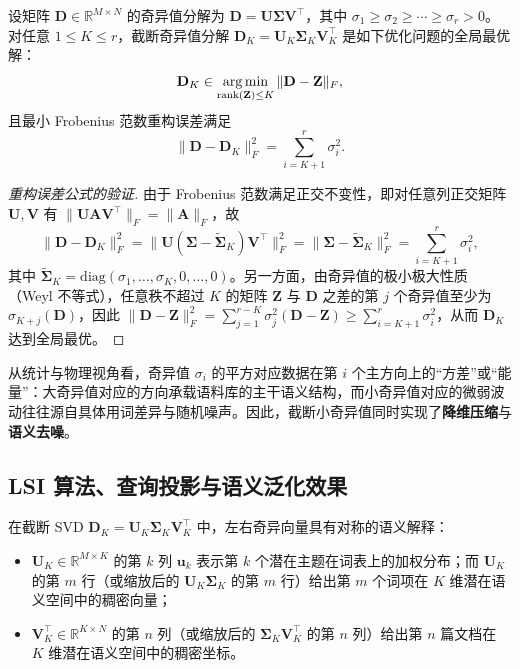 \begin{theorem}\label{thm:eym}
设矩阵 $\mathbf{D}\in\mathbb{R}^{M\times N}$ 的奇异值分解为 $\mathbf{D}=\mathbf{U}\boldsymbol{\Sigma}\mathbf{V}^\top$，其中 $\sigma_1\ge\sigma_2\ge\cdots\ge\sigma_r>0$。对任意 $1\le K\le r$，截断奇异值分解 $\mathbf{D}_K = \mathbf{U}_K\boldsymbol{\Sigma}_K\mathbf{V}_K^\top$ 是如下优化问题的全局最优解：
\[
\mathbf{D}_K \in \operatorname*{arg\,min}_{\mathrm{rank}(\mathbf{Z})\le K} \|\mathbf{D} - \mathbf{Z}\|_F,
\]
且最小 Frobenius 范数重构误差满足
\[
\|\mathbf{D} - \mathbf{D}_K\|_F^2 = \sum_{i=K+1}^{r} \sigma_i^2.
\]
\end{theorem}
\begin{proof}[重构误差公式的验证]
由于 Frobenius 范数满足正交不变性，即对任意列正交矩阵 $\mathbf{U}, \mathbf{V}$ 有 $\|\mathbf{U}\mathbf{A}\mathbf{V}^\top\|_F = \|\mathbf{A}\|_F$，故
\[
\|\mathbf{D} - \mathbf{D}_K\|_F^2
= \|\mathbf{U}(\boldsymbol{\Sigma} - \tilde{\boldsymbol{\Sigma}}_K)\mathbf{V}^\top\|_F^2
= \|\boldsymbol{\Sigma} - \tilde{\boldsymbol{\Sigma}}_K\|_F^2
= \sum_{i=K+1}^{r} \sigma_i^2,
\]
其中 $\tilde{\boldsymbol{\Sigma}}_K=\mathrm{diag}(\sigma_1,\dots,\sigma_K,0,\dots,0)$。另一方面，由奇异值的极小极大性质（Weyl 不等式），任意秩不超过 $K$ 的矩阵 $\mathbf{Z}$ 与 $\mathbf{D}$ 之差的第 $j$ 个奇异值至少为 $\sigma_{K+j}(\mathbf{D})$，因此 $\|\mathbf{D}-\mathbf{Z}\|_F^2 = \sum_{j=1}^{r-K}\sigma_j^2(\mathbf{D}-\mathbf{Z}) \ge \sum_{i=K+1}^r \sigma_i^2$，从而 $\mathbf{D}_K$ 达到全局最优。
\end{proof}

从统计与物理视角看，奇异值 $\sigma_i$ 的平方对应数据在第 $i$ 个主方向上的“方差”或“能量”：大奇异值对应的方向承载语料库的主干语义结构，而小奇异值对应的微弱波动往往源自具体用词差异与随机噪声。因此，截断小奇异值同时实现了\textbf{降维压缩}与\textbf{语义去噪}。

\subsection{LSI 算法、查询投影与语义泛化效果}

在截断 SVD $\mathbf{D}_K = \mathbf{U}_K \boldsymbol{\Sigma}_K \mathbf{V}_K^\top$ 中，左右奇异向量具有对称的语义解释：
\begin{itemize}
  \item $\mathbf{U}_K\in\mathbb{R}^{M\times K}$ 的第 $k$ 列 $\mathbf{u}_k$ 表示第 $k$ 个潜在主题在词表上的加权分布；而 $\mathbf{U}_K$ 的第 $m$ 行（或缩放后的 $\mathbf{U}_K\boldsymbol{\Sigma}_K$ 的第 $m$ 行）给出第 $m$ 个词项在 $K$ 维潜在语义空间中的稠密向量；
  \item $\mathbf{V}_K^\top\in\mathbb{R}^{K\times N}$ 的第 $n$ 列（或缩放后的 $\boldsymbol{\Sigma}_K\mathbf{V}_K^\top$ 的第 $n$ 列）给出第 $n$ 篇文档在 $K$ 维潜在语义空间中的稠密坐标。
\end{itemize}

